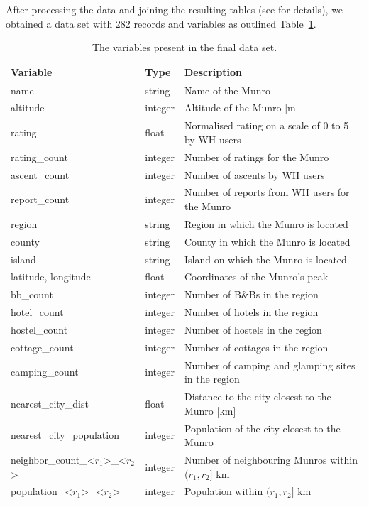 \documentclass[11pt,a4paper]{article}
\begin{document}
After processing the data and joining the resulting tables (see  for details), we obtained a data set with 282 records and variables as outlined Table~\ref{table:1}.

\begin{table}
    \caption{The variables present in the final data set.}
    \label{table:1}
    \centering
    \begin{tabular}{l  l  l} 
        \toprule
        Variable & Type & Description  \\ 
        \midrule
        name & string & Name of the Munro \\ 
        altitude & integer & Altitude of the Munro [m] \\
        \hline
        rating & float & Normalised rating on a scale of 0 to 5 by WH users\\
        rating\_count & integer & Number of ratings for the Munro \\
        ascent\_count & integer & Number of ascents by WH users\\
        report\_count & integer & Number of reports from WH users for the Munro\\
        \hline
        region & string & Region in which the Munro is located \\
        county & string & County in which the Munro is located\\
        island & string & Island on which the Munro is located\\
        latitude, longitude & float & Coordinates of the Munro's peak\\
        \hline
        bb\_count & integer & Number of B\&Bs in the region\\
        hotel\_count & integer & Number of hotels in the region\\
        hostel\_count & integer & Number of hostels in the region\\
        cottage\_count & integer & Number of cottages in the region\\
        camping\_count & integer & Number of camping and glamping sites in the region\\
        \hline
        nearest\_city\_dist & float & Distance to the city closest to the Munro [km]\\
        nearest\_city\_population & integer & Population of the city closest to the Munro\\
        neighbor\_count\_<$r_1$>\_<$r_2$> & integer & Number of neighbouring Munros within $(r_1,r_2]$ km\\
        population\_<$r_1$>\_<$r_2$> & integer & Population within $(r_1,r_2]$ km\\
        \bottomrule
    \end{tabular}
\end{table}
\end{document}

